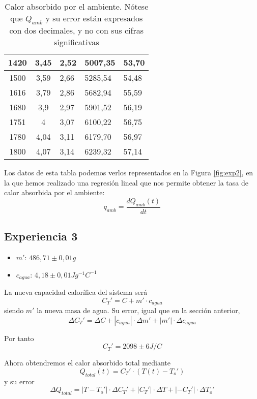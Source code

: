 \documentclass[a4paper,12pt,spanish]{article}
\begin{document}
\begin{table}[H]
\begin{tabular}{|c|c|l|l|l|}
		1420               & 3,45              & 2,52    & 5007,35   & 53,70            \\ \hline
		1500               & 3,59              & 2,66    & 5285,54   & 54,48            \\ \hline
		1616               & 3,79              & 2,86    & 5682,94   & 55,59            \\ \hline
		1680               & 3,9               & 2,97    & 5901,52   & 56,19            \\ \hline
		1751               & 4                 & 3,07    & 6100,22   & 56,75            \\ \hline
		1780               & 4,04              & 3,11    & 6179,70   & 56,97            \\ \hline
		1800               & 4,07              & 3,14    & 6239,32   & 57,14            \\ \hline
	\end{tabular}
	\caption{Calor absorbido por el ambiente. Nótese que $Q_{amb}$ y su error están expresados con dos decimales, y no con sus cifras significativas}
	\label{tab:exp2}
\end{table}

Los datos de esta tabla podemos verlos representados en la Figura \ref{fig:exp2}, en la que hemos realizado una regresión lineal que nos permite obtener la tasa de calor absorbida por el ambiente:
\[ q_{amb} = \frac{dQ_{amb}(t)}{dt}
\]

	\subsection{Experiencia 3}

	\begin{itemize}
		\item $m'$: $486,71 \pm 0,01 \si{g}$
		\item $c_{agua}$: $4,18\pm 0,01 \si{Jg^{-1}C^{-1}}$
	\end{itemize}
	

	La nueva capacidad calorífica del sistema será
	\[C_T' = C + m'\cdot c_{agua}
	\] 
	siendo $m'$ la nueva masa de agua.
	Su error, igual que en la sección anterior, 
	\[  \Delta C_T' = \Delta C + |c_{agua}| \cdot \Delta m' + |m'| \cdot \Delta c_{agua}  \]
	
	Por tanto 
	\[  \boxed{ C_T' =  2098 \pm  6 \si{J/C} }\]
	
	Ahora obtendremos el calor absorbido total mediante
	\[ Q_{total}(t) = C_T'\cdot (T(t)-T_o')
	\]
	y su error
	\[\Delta Q_{total} = |T-T_o'|\cdot\Delta C_T' + |C_T'|\cdot\Delta T + |-C_T'|\cdot\Delta T_o'\]
	
\end{document}
